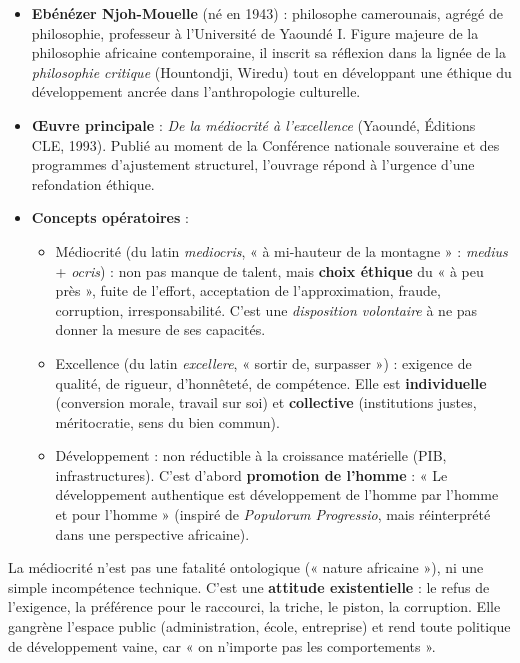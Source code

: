 \documentclass[11pt]{article}
\newcommand{\cle}[1]{{\popxbold\color{popdark}#1}}
\begin{document}
\begin{aretenir}
\begin{itemize}
\item \textbf{Ebénézer Njoh-Mouelle} (né en 1943) : philosophe camerounais, agrégé de philosophie, professeur à l'Université de Yaoundé I. Figure majeure de la philosophie africaine contemporaine, il inscrit sa réflexion dans la lignée de la \emph{philosophie critique} (Hountondji, Wiredu) tout en développant une éthique du développement ancrée dans l'anthropologie culturelle.
\item \textbf{Œuvre principale} : \emph{De la médiocrité à l'excellence} (Yaoundé, Éditions CLE, 1993). Publié au moment de la Conférence nationale souveraine et des programmes d'ajustement structurel, l'ouvrage répond à l'urgence d'une refondation éthique.
\item \textbf{Concepts opératoires} :
\begin{itemize}
\item \cle{Médiocrité} (du latin \emph{mediocris}, « à mi-hauteur de la montagne » : \emph{medius} + \emph{ocris}) : non pas manque de talent, mais \textbf{choix éthique} du « à peu près », fuite de l'effort, acceptation de l'approximation, fraude, corruption, irresponsabilité. C'est une \emph{disposition volontaire} à ne pas donner la mesure de ses capacités.
\item \cle{Excellence} (du latin \emph{excellere}, « sortir de, surpasser ») : exigence de qualité, de rigueur, d'honnêteté, de compétence. Elle est \textbf{individuelle} (conversion morale, travail sur soi) et \textbf{collective} (institutions justes, méritocratie, sens du bien commun).
\item \cle{Développement} : non réductible à la croissance matérielle (PIB, infrastructures). C'est d'abord \textbf{promotion de l'homme} : « Le développement authentique est développement de l'homme par l'homme et pour l'homme » (inspiré de \emph{Populorum Progressio}, mais réinterprété dans une perspective africaine).
\end{itemize}
\end{itemize}
\end{aretenir}

\begin{definition}
La médiocrité n'est pas une fatalité ontologique (« nature africaine »), ni une simple incompétence technique. C'est une \textbf{attitude existentielle} : le refus de l'exigence, la préférence pour le raccourci, la triche, le piston, la corruption. Elle gangrène l'espace public (administration, école, entreprise) et rend toute politique de développement vaine, car « on n'importe pas les comportements ».
\end{definition}
\end{document}
